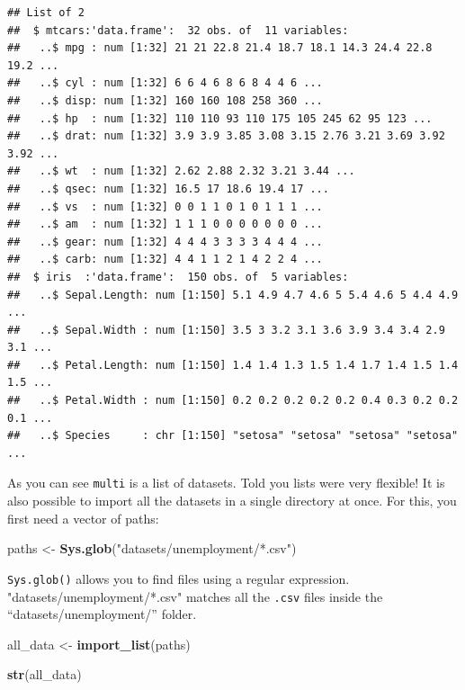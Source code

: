 \documentclass[]{gitbook}
\newenvironment{Shaded}{\begin{snugshade}}{\end{snugshade}}
\newcommand{\KeywordTok}[1]{\textcolor[rgb]{0.13,0.29,0.53}{\textbf{#1}}}
\newcommand{\NormalTok}[1]{#1}
\newcommand{\StringTok}[1]{\textcolor[rgb]{0.31,0.60,0.02}{#1}}
\begin{document}
\begin{verbatim}
## List of 2
##  $ mtcars:'data.frame':  32 obs. of  11 variables:
##   ..$ mpg : num [1:32] 21 21 22.8 21.4 18.7 18.1 14.3 24.4 22.8 19.2 ...
##   ..$ cyl : num [1:32] 6 6 4 6 8 6 8 4 4 6 ...
##   ..$ disp: num [1:32] 160 160 108 258 360 ...
##   ..$ hp  : num [1:32] 110 110 93 110 175 105 245 62 95 123 ...
##   ..$ drat: num [1:32] 3.9 3.9 3.85 3.08 3.15 2.76 3.21 3.69 3.92 3.92 ...
##   ..$ wt  : num [1:32] 2.62 2.88 2.32 3.21 3.44 ...
##   ..$ qsec: num [1:32] 16.5 17 18.6 19.4 17 ...
##   ..$ vs  : num [1:32] 0 0 1 1 0 1 0 1 1 1 ...
##   ..$ am  : num [1:32] 1 1 1 0 0 0 0 0 0 0 ...
##   ..$ gear: num [1:32] 4 4 4 3 3 3 3 4 4 4 ...
##   ..$ carb: num [1:32] 4 4 1 1 2 1 4 2 2 4 ...
##  $ iris  :'data.frame':  150 obs. of  5 variables:
##   ..$ Sepal.Length: num [1:150] 5.1 4.9 4.7 4.6 5 5.4 4.6 5 4.4 4.9 ...
##   ..$ Sepal.Width : num [1:150] 3.5 3 3.2 3.1 3.6 3.9 3.4 3.4 2.9 3.1 ...
##   ..$ Petal.Length: num [1:150] 1.4 1.4 1.3 1.5 1.4 1.7 1.4 1.5 1.4 1.5 ...
##   ..$ Petal.Width : num [1:150] 0.2 0.2 0.2 0.2 0.2 0.4 0.3 0.2 0.2 0.1 ...
##   ..$ Species     : chr [1:150] "setosa" "setosa" "setosa" "setosa" ...
\end{verbatim}

As you can see \texttt{multi} is a list of datasets. Told you lists were very flexible! It is also possible
to import all the datasets in a single directory at once. For this, you first need a vector of paths:

\begin{Shaded}
\begin{Highlighting}[]
\NormalTok{paths <-}\StringTok{ }\KeywordTok{Sys.glob}\NormalTok{(}\StringTok{"datasets/unemployment/*.csv"}\NormalTok{)}
\end{Highlighting}
\end{Shaded}

\texttt{Sys.glob()} allows you to find files using a regular expression. "datasets/unemployment/*.csv"
matches all the \texttt{.csv} files inside the ``datasets/unemployment/'' folder.

\begin{Shaded}
\begin{Highlighting}[]
\NormalTok{all_data <-}\StringTok{ }\KeywordTok{import_list}\NormalTok{(paths)}

\KeywordTok{str}\NormalTok{(all_data)}
\end{Highlighting}
\end{Shaded}
\end{document}
